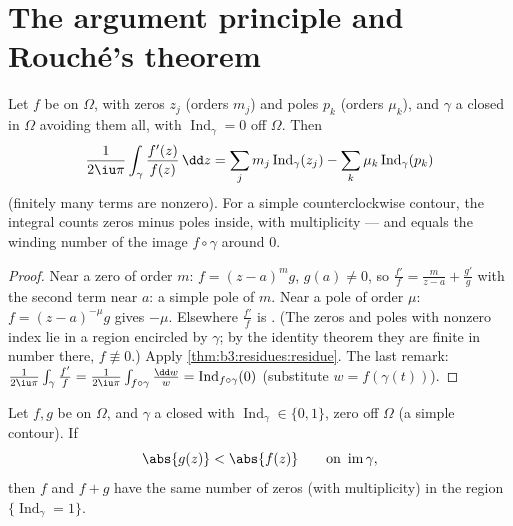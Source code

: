 \section{The argument principle and Rouch\'e's theorem}

\begin{theorem}
\label{thm:b3:residues:argument}
Let $f$ be  on $\Omega$, with zeros $z_j$ (orders
$m_j$) and poles $p_k$ (orders $\mu_k$), and $\gamma$ a closed
 in $\Omega$ avoiding them all, with
$\operatorname{Ind}_\gamma = 0$ off $\Omega$. Then
\[
\frac1{2\iu\pi}\int_\gamma\frac{f'(z)}{f(z)}\,\dd z
= \sum_j m_j\operatorname{Ind}_\gamma(z_j)
- \sum_k \mu_k\operatorname{Ind}_\gamma(p_k)
\]
(finitely many terms are nonzero). For a simple
counterclockwise contour, the integral counts zeros minus
poles inside, with multiplicity --- and equals the winding
number of the image  $f\circ\gamma$ around $0$.
\end{theorem}

\begin{proof}
Near a zero of order $m$: $f = (z-a)^mg$, $g(a) \neq 0$, so
$\frac{f'}f = \frac m{z - a} + \frac{g'}g$ with the second
term  near $a$: a simple pole of  $m$. Near
a pole of order $\mu$: $f = (z-a)^{-\mu}g$ gives 
$-\mu$. Elsewhere $\frac{f'}f$ is . (The zeros and
poles with nonzero index lie in a  region encircled by
$\gamma$; by the identity theorem they are finite in number
there, $f \not\equiv 0$.) Apply
\cref{thm:b3:residues:residue}. The last remark:
$\frac1{2\iu\pi}\int_\gamma\frac{f'}f =
\frac1{2\iu\pi}\int_{f\circ\gamma}\frac{\dd w}w =
\operatorname{Ind}_{f\circ\gamma}(0)$ (substitute $w =
f(\gamma(t))$).
\end{proof}

\begin{theorem}[Rouch\'e]\label{thm:b3:residues:rouche}
Let $f, g$ be  on $\Omega$, and $\gamma$ a closed
 with $\operatorname{Ind}_\gamma \in \{0,1\}$, zero off
$\Omega$ (a simple contour). If
\[
\abs{g(z)} < \abs{f(z)} \qquad \text{on }
\operatorname{im}\gamma,
\]
then $f$ and $f + g$ have the same number of zeros (with
multiplicity) in the region $\{\operatorname{Ind}_\gamma =
1\}$.
\end{theorem}

